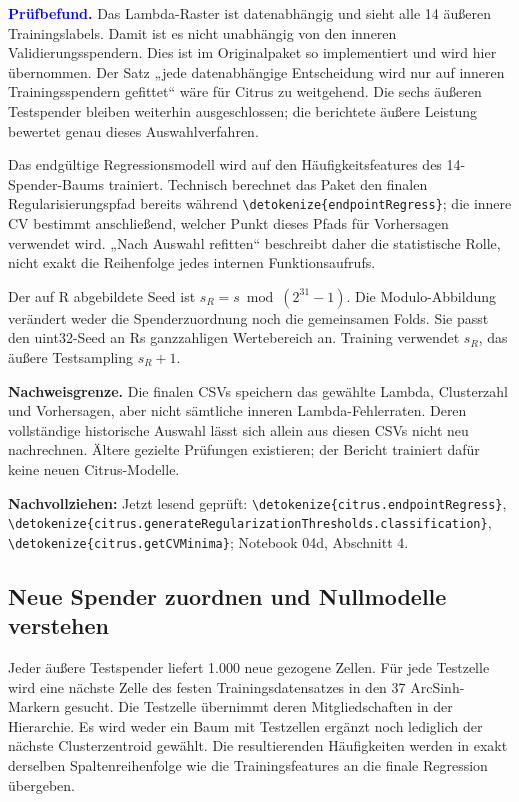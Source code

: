 \documentclass[11pt,a4paper]{article}
\newcommand{\code}[1]{\expandafter\nolinkurl\expandafter{\detokenize{#1}}}
\newcommand{\source}[1]{\par{\footnotesize\raggedright\color{muted}\textbf{Nachvollziehen:} #1\par}}
\newcommand{\finding}[1]{\par\smallskip\noindent\textcolor{blue}{\textbf{Prüfbefund.}} #1\par}
\begin{document}
\finding{Das Lambda-Raster ist datenabhängig und sieht alle 14 äußeren
Trainingslabels. Damit ist es nicht unabhängig von den inneren
Validierungsspendern. Dies ist im Originalpaket so implementiert und
wird hier übernommen. Der Satz „jede datenabhängige Entscheidung wird nur
auf inneren Trainingsspendern gefittet“ wäre für Citrus zu weitgehend.
Die sechs äußeren Testspender bleiben weiterhin ausgeschlossen; die
berichtete äußere Leistung bewertet genau dieses Auswahlverfahren.}

Das endgültige Regressionsmodell wird auf den Häufigkeitsfeatures des
14-Spender-Baums trainiert. Technisch berechnet das Paket den finalen
Regularisierungspfad bereits während \code{endpointRegress}; die innere
CV bestimmt anschließend, welcher Punkt dieses Pfads für Vorhersagen
verwendet wird. „Nach Auswahl refitten“ beschreibt daher die statistische
Rolle, nicht exakt die Reihenfolge jedes internen Funktionsaufrufs.

Der auf R abgebildete Seed ist
\(s_R=s\bmod(2^{31}-1)\). Die Modulo-Abbildung verändert weder die
Spenderzuordnung noch die gemeinsamen Folds. Sie passt den uint32-Seed
an Rs ganzzahligen Wertebereich an. Training verwendet \(s_R\),
das äußere Testsampling \(s_R+1\).

\textbf{Nachweisgrenze.} Die finalen CSVs speichern das gewählte Lambda,
Clusterzahl und Vorhersagen, aber nicht sämtliche inneren
Lambda-Fehlerraten. Deren vollständige historische Auswahl lässt sich
allein aus diesen CSVs nicht neu nachrechnen. Ältere gezielte Prüfungen
existieren; der Bericht trainiert dafür keine neuen Citrus-Modelle.
\source{Jetzt lesend geprüft: \code{citrus.endpointRegress},
\code{citrus.generateRegularizationThresholds.classification},
\code{citrus.getCVMinima}; Notebook 04d, Abschnitt 4.}

\clearpage
\subsection*{Neue Spender zuordnen und Nullmodelle verstehen}
Jeder äußere Testspender liefert 1.000 neue gezogene Zellen. Für jede
Testzelle wird eine nächste Zelle des festen Trainingsdatensatzes in den
37 ArcSinh-Markern gesucht. Die Testzelle übernimmt deren Mitgliedschaften
in der Hierarchie. Es wird weder ein Baum mit Testzellen ergänzt noch
lediglich der nächste Clusterzentroid gewählt. Die resultierenden
Häufigkeiten werden in exakt derselben Spaltenreihenfolge wie die
Trainingsfeatures an die finale Regression übergeben.
\end{document}
